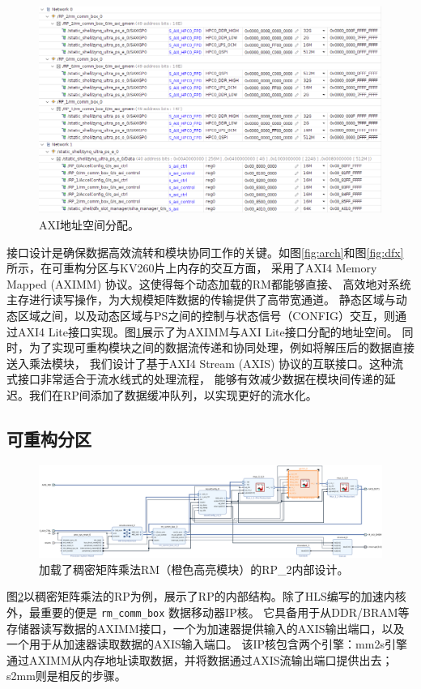 \begin{figure}[htbp]
\centerline{\includegraphics[width=0.8\columnwidth]{figures/mem.png}}
\caption{AXI地址空间分配。}
\label{fig:network}
\end{figure}

接口设计是确保数据高效流转和模块协同工作的关键。如图\ref{fig:arch}和图\ref{fig:dfx}所示，在可重构分区与KV260片上内存的交互方面，
采用了AXI4 Memory Mapped (AXIMM) 协议。这使得每个动态加载的RM都能够直接、
高效地对系统主存进行读写操作，为大规模矩阵数据的传输提供了高带宽通道。
静态区域与动态区域之间，以及动态区域与PS之间的控制与状态信号（CONFIG）交互，则通过AXI4 Lite接口实现。图\ref{fig:network}展示了为AXIMM与AXI Lite接口分配的地址空间。
同时，为了实现可重构模块之间的数据流传递和协同处理，例如将解压后的数据直接送入乘法模块，
我们设计了基于AXI4 Stream (AXIS) 协议的互联接口。这种流式接口非常适合于流水线式的处理流程，
能够有效减少数据在模块间传递的延迟。我们在RP间添加了数据缓冲队列，以实现更好的流水化。

\subsection{可重构分区}

\begin{figure}[htbp]
\centerline{\includegraphics[width=\columnwidth]{figures/rp2.png}}
\caption{加载了稠密矩阵乘法RM（橙色高亮模块）的RP\_2内部设计。}
\label{fig:rp}
\end{figure}

图\ref{fig:rp}以稠密矩阵乘法的RP为例，展示了RP的内部结构。除了HLS编写的加速内核外，最重要的便是 \verb|rm_comm_box| 数据移动器IP核。
它具备用于从DDR/BRAM等存储器读写数据的AXIMM接口，一个为加速器提供输入的AXIS输出端口，以及一个用于从加速器读取数据的AXIS输入端口。
该IP核包含两个引擎：mm2s引擎通过AXIMM从内存地址读取数据，并将数据通过AXIS流输出端口提供出去；s2mm则是相反的步骤。

